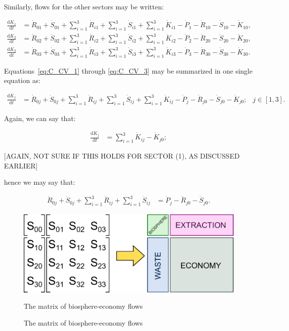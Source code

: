 Similarly, flows for the other sectors may be written:

\begin{align} \label{eq:C_CV_1}
	\frac{\mathrm{d}K_{1}}{\mathrm{d}t}		
	& =  \dot{R}_{01} 
	+ \dot{S}_{01}
	+ \sum_{i = 1}^{3}\dot{R}_{i1}
	+ \sum_{i = 1}^{3}\dot{S}_{i1}
	+ \sum_{i = 1}^{3}\dot{K}_{i1}
	- \dot{P}_{1}
	- \dot{R}_{10} 
	- \dot{S}_{10}
	- \dot{K}_{10},										\\
	\label{eq:C_CV_2}
	\frac{\mathrm{d}K_{2}}{\mathrm{d}t}		
	& =  \dot{R}_{02} 
	+ \dot{S}_{02}
	+ \sum_{i = 1}^{3}\dot{R}_{i2}
	+ \sum_{i = 1}^{3}\dot{S}_{i2}
	+ \sum_{i = 1}^{3}\dot{K}_{i2}
	- \dot{P}_{2}
	- \dot{R}_{20} 
	- \dot{S}_{20}
	- \dot{K}_{20},										\\	
	\label{eq:C_CV_3}
	\frac{\mathrm{d}K_{3}}{\mathrm{d}t}		
	& =  \dot{R}_{03} 
	+ \dot{S}_{03}
	+ \sum_{i = 1}^{3}\dot{R}_{i3}
	+ \sum_{i = 1}^{3}\dot{S}_{i3}
	+ \sum_{i = 1}^{3}\dot{K}_{i3}
	- \dot{P}_{3}
	- \dot{R}_{30} 
	- \dot{S}_{30}
	- \dot{K}_{30}.										
\end{align}

Equations~\ref{eq:C_CV_1} through \ref{eq:C_CV_3} may be summarized
in one single equation as:

\begin{align} \label{eq:C_CV_1_to_3_b}
	\frac{\mathrm{d}K_{j}}{\mathrm{d}t}		
	& =  \dot{R}_{0j} 
	+ \dot{S}_{0j}
	+ \sum_{i = 1}^{3}\dot{R}_{ij}
	+ \sum_{i = 1}^{3}\dot{S}_{ij}
	+ \sum_{i = 1}^{3}\dot{K}_{ij}
	- \dot{P}_{j}
	- \dot{R}_{j0} 
	- \dot{S}_{j0}
	- \dot{K}_{j0};
	& j \in \left[1,3\right].
\end{align}

Again, we can say that:

\begin{align} \label{eq:C_CV_K_balance}
	\frac{\mathrm{d}K_{j}}{\mathrm{d}t}		
	& =  \sum_{i = 1}^{3}\dot{K}_{ij}
	- \dot{K}_{j0};
\end{align}

[AGAIN, NOT SURE IF THIS HOLDS FOR SECTOR (1), AS DISCUSSED EARLIER]

\noindent hence we may say that:

\begin{align} \label{eq:C_CV_1_to_3_c}
	\dot{R}_{0j} 
	+ \dot{S}_{0j}
	+ \sum_{i = 1}^{3}\dot{R}_{ij}
	+ \sum_{i = 1}^{3}\dot{S}_{ij}
	& = \dot{P}_{j}
	- \dot{R}_{j0} 
	- \dot{S}_{j0}.
\end{align}



\begin{figure}[h!]
\centering
\includegraphics[width=0.8\linewidth]{Part_1/Chapter_Materials/images/Matrix.pdf}
\caption{The matrix of biosphere-economy flows}{The matrix of biosphere-economy flows}
\label{fig:C_mat_matrix}
\end{figure}

